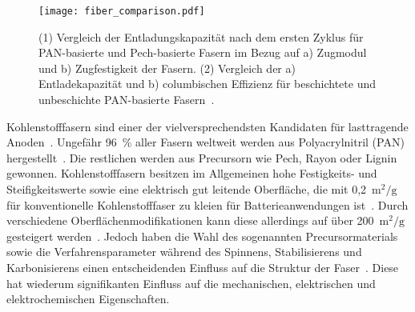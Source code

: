

\begin{figure}[!h]
        \center
		\texttt{[image: fiber\_comparison.pdf]}
		\caption{\label{fig:fiber_comp}(1) Vergleich der Entladungskapazität nach dem ersten Zyklus für PAN-basierte und Pech-basierte Fasern im Bezug auf a) Zugmodul und b) Zugfestigkeit der Fasern. (2) Vergleich der a) Entladekapazität und b) columbischen Effizienz für beschichtete und unbeschichte PAN-basierte Fasern~\cite{Kjell2011,Snyder2009a,Hagberg2016,Ye2024}.}
\end{figure}
Kohlenstofffasern sind einer der vielversprechendsten Kandidaten für lasttragende Anoden~\cite{Greenhalgh2024a}. Ungefähr 96~\% aller Fasern weltweit werden aus Polyacrylnitril (PAN) hergestellt~\cite{Das2016}. Die restlichen werden aus Precursorn wie Pech, Rayon oder Lignin gewonnen. Kohlenstofffasern besitzen im Allgemeinen hohe Festigkeits- und Steifigkeitswerte sowie eine elektrisch gut leitende Oberfläche, die mit 0,2~$\si{\metre\squared\per\g}$ für konventionelle Kohlenstofffaser zu kleien für Batterieanwendungen ist~\cite{Qian2013,Senokos2023}. Durch verschiedene Oberflächenmodifikationen kann diese allerdings auf über 200~$\si{\metre\squared\per\g}$ gesteigert werden~\cite{Zenkert2024}. Jedoch haben die Wahl des sogenannten Precursormaterials sowie die Verfahrensparameter während des Spinnens, Stabilisierens und Karbonisierens einen entscheidenden Einfluss auf die Struktur der Faser~\cite{Newcomb2015}. Diese hat wiederum signifikanten Einfluss auf die mechanischen, elektrischen und elektrochemischen Eigenschaften.

